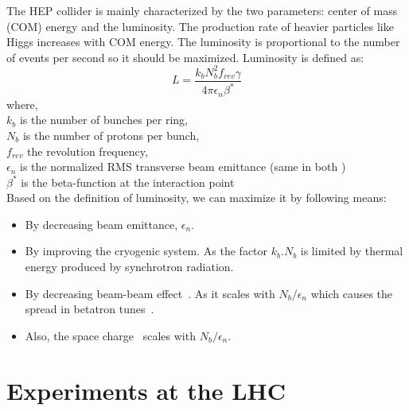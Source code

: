 The HEP collider is mainly characterized by the two parameters: center of mass (COM) energy and the luminosity. The production rate of heavier particles like Higgs increases with COM energy. The luminosity is proportional to the number of events per second so it should be maximized. Luminosity is defined as:
\begin{equation}
    L = \frac{k_bN_b^2f_{rev}\gamma}{4 \pi \epsilon_n \beta^*}
\end{equation}
where,\\
\hspace{2cm}$k_b$ is the number of bunches per ring,\\
\hspace{2cm}$N_b$ is the number of protons per bunch,\\
\hspace{2cm}$f_{rev}$ the revolution frequency,\\
\hspace{2cm}$\epsilon_n$ is the normalized RMS transverse beam emittance (same in both )\\
\hspace{2cm}$\beta^*$ is the beta-function at the interaction point\\

Based on the definition of luminosity, we can maximize it by following means:
\begin{itemize}
    \item By decreasing beam emittance, $\epsilon_n$.
    \item By improving the cryogenic system. As the factor $k_b.N_b$ is limited by thermal energy produced by synchrotron radiation.
    \item By decreasing beam-beam effect~\cite{Herr2014,Papotti2014}. As it scales with $N_b/ \epsilon_n$ which causes the spread in betatron tunes~\cite{Dubouchet2013}.
    \item Also, the space charge~\cite{Oeftiger2016} scales with $N_b/ \epsilon_n$.
\end{itemize}


\section{Experiments at the LHC} %
\label{sec:experiments_at_the_lhc}

